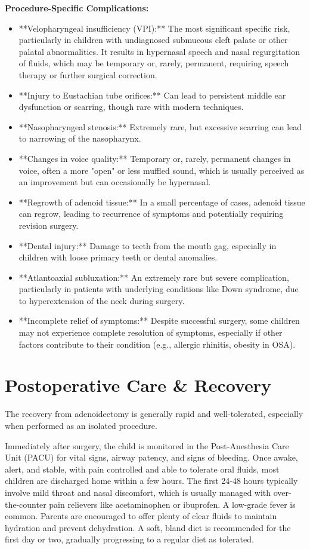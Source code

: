 \textbf{Procedure-Specific Complications:}
\begin{itemize}
  \item **Velopharyngeal insufficiency (VPI):** The most significant specific risk, particularly in children with undiagnosed submucous cleft palate or other palatal abnormalities. It results in hypernasal speech and nasal regurgitation of fluids, which may be temporary or, rarely, permanent, requiring speech therapy or further surgical correction.
  \item **Injury to Eustachian tube orifices:** Can lead to persistent middle ear dysfunction or scarring, though rare with modern techniques.
  \item **Nasopharyngeal stenosis:** Extremely rare, but excessive scarring can lead to narrowing of the nasopharynx.
  \item **Changes in voice quality:** Temporary or, rarely, permanent changes in voice, often a more "open" or less muffled sound, which is usually perceived as an improvement but can occasionally be hypernasal.
  \item **Regrowth of adenoid tissue:** In a small percentage of cases, adenoid tissue can regrow, leading to recurrence of symptoms and potentially requiring revision surgery.
  \item **Dental injury:** Damage to teeth from the mouth gag, especially in children with loose primary teeth or dental anomalies.
  \item **Atlantoaxial subluxation:** An extremely rare but severe complication, particularly in patients with underlying conditions like Down syndrome, due to hyperextension of the neck during surgery.
  \item **Incomplete relief of symptoms:** Despite successful surgery, some children may not experience complete resolution of symptoms, especially if other factors contribute to their condition (e.g., allergic rhinitis, obesity in OSA).
\end{itemize}

\section*{Postoperative Care \& Recovery}
The recovery from adenoidectomy is generally rapid and well-tolerated, especially when performed as an isolated procedure.

Immediately after surgery, the child is monitored in the Post-Anesthesia Care Unit (PACU) for vital signs, airway patency, and signs of bleeding. Once awake, alert, and stable, with pain controlled and able to tolerate oral fluids, most children are discharged home within a few hours. The first 24-48 hours typically involve mild throat and nasal discomfort, which is usually managed with over-the-counter pain relievers like acetaminophen or ibuprofen. A low-grade fever is common. Parents are encouraged to offer plenty of clear fluids to maintain hydration and prevent dehydration. A soft, bland diet is recommended for the first day or two, gradually progressing to a regular diet as tolerated.

